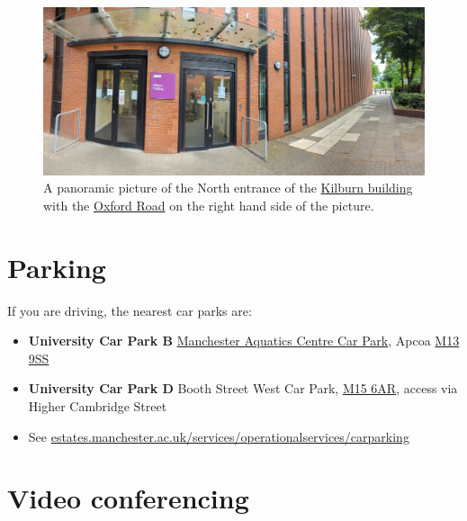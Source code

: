 \documentclass[
  12pt,
]{book}
\providecommand{\tightlist}{%
  \setlength{\itemsep}{0pt}\setlength{\parskip}{0pt}}
\begin{document}
\begin{figure}

{\centering \includegraphics[width=1\linewidth]{images/kilburn-north-entrance} 

}

\caption{A panoramic picture of the North entrance of the \href{https://en.wikipedia.org/wiki/Kilburn_Building}{Kilburn building} with the \href{https://en.wikipedia.org/wiki/Wilmslow_Road}{Oxford Road} on the right hand side of the picture.}\label{fig:kilburnnorth-fig}
\end{figure}



\hypertarget{parking}{%
\section{Parking}\label{parking}}

If you are driving, the nearest car parks are:

\begin{itemize}
\tightlist
\item
  \textbf{University Car Park B} \href{https://www.apcoa.co.uk/parking-in/manchester/aquatics-centre/}{Manchester Aquatics Centre Car Park}, Apcoa \href{http://maps.google.co.uk/maps?q=M13+9SS}{M13 9SS}
\item
  \textbf{University Car Park D} Booth Street West Car Park, \href{http://maps.google.co.uk/maps?q=M15+6AR}{M15 6AR}, access via Higher Cambridge Street
\item
  See \href{https://www.estates.manchester.ac.uk/services/operationalservices/carparking/}{estates.manchester.ac.uk/services/operationalservices/carparking}
\end{itemize}

\hypertarget{video}{%
\section{Video conferencing}\label{video}}
\end{document}
